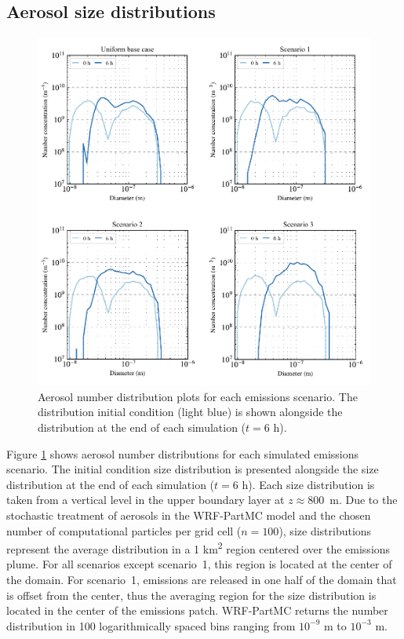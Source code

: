 \subsection{Aerosol size distributions}\label{size-dists}

\begin{figure}[!t]
  \centering
    \includegraphics[width=\textwidth]{figures/chapter5/number-distribution-plots.pdf}
    \caption{Aerosol number distribution plots for each emissions scenario. The distribution initial condition (light blue) is shown alongside the distribution at the end of each simulation ($t=6$ h).}
    \label{fig:number-dists}
\end{figure}

Figure \ref{fig:number-dists} shows aerosol number distributions for each simulated emissions scenario. The initial condition size distribution is presented alongside the size distribution at the end of each simulation ($t=6$ h). Each size distribution is taken from a vertical level in the upper boundary layer at $z\approx800$~\si{m}. Due to the stochastic treatment of aerosols in the WRF-PartMC model and the chosen number of computational particles per grid cell ($n=100$), size distributions represent the average distribution in a 1 \si{km^2} region centered over the emissions plume. For all scenarios except scenario~1, this region is located at the center of the domain. For scenario~1, emissions are released in one half of the domain that is offset from the center, thus the averaging region for the size distribution is located in the center of the emissions patch. WRF-PartMC returns the number distribution in 100 logarithmically spaced bins ranging from $10^{-9}$ m to $10^{-3}$ m.

